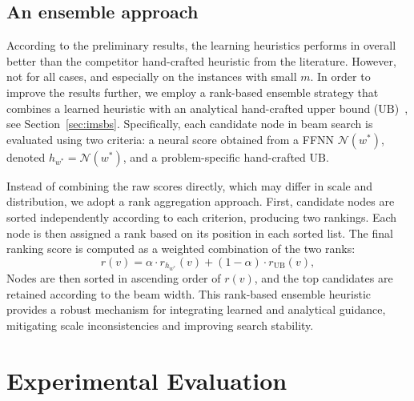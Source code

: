 \documentclass[runningheads]{llncs}
\begin{document}
    
  \subsection{An ensemble approach}
    
    According to the preliminary results, the learning heuristics performs in overall better than the competitor hand-crafted heuristic from the literature. However, not for all cases, and especially on the instances with small $m$.  In order to improve the results further, we employ a rank-based ensemble strategy that combines a learned heuristic with an analytical hand-crafted upper bound ($\text{UB}$)~\cite{djukanovic2026_eurocast}, see Section~\ref{sec:imsbs}.  Specifically, each candidate node in beam search is evaluated using two criteria: a neural score obtained from a FFNN $\mathcal{N}(w^*)$, denoted $h_{w^*}=\mathcal{N}({w^*})$,  and  a problem-specific hand-crafted $\text{UB}$. 
    
    Instead of combining the raw scores directly, which may differ in scale and distribution, we adopt a rank aggregation approach. First, candidate nodes are sorted independently according to each criterion, producing two rankings. Each node is then assigned a rank based on its position in each sorted list.   The final ranking score is computed as a weighted combination of the two ranks:
    \begin{equation}\label{eq:ensemble_heuristic}
        r(v) = \alpha \cdot r_{h_{w^*}}(v) + (1 - \alpha) \cdot r_{\text{UB}}(v),
    \end{equation}
    Nodes are then sorted in ascending order of $r(v)$, and the top candidates are retained according to the beam width. This rank-based ensemble heuristic provides a robust mechanism for integrating learned and analytical guidance, mitigating scale inconsistencies and improving search stability. 
     
 
\section{Experimental Evaluation}\label{sec:experiments}
\end{document}

